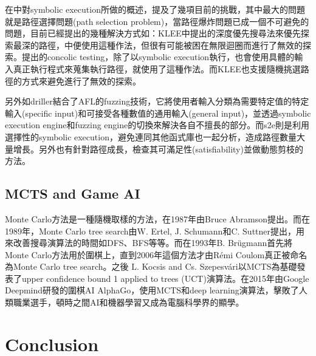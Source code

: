 \documentclass[12pt,a4paper,oneside]{book}
\begin{document}
在\cite{sharma2012critical}\cite{schwartz2010all}中對symbolic execution所做的概述，提及了幾項目前的挑戰，其中最大的問題就是路徑選擇問題(path selection problem)，當路徑爆炸問題已成一個不可避免的問題，目前已經提出的幾種解決方式如：KLEE\cite{cadar2008klee}中提出的深度優先搜尋法來優先探索最深的路徑，中便使用這種作法，但很有可能被困在無限迴圈而進行了無效的探索。\cite{sen2007concolic}提出的concolic testing，除了以symbolic execution執行，也會使用具體的輸入真正執行程式來蒐集執行路徑，\cite{sen2005cute}就使用了這種作法。而KLEE\cite{cadar2008klee}也支援隨機挑選路徑的方式來避免進行了無效的探索。

另外如driller\cite{stephens2016driller}結合了AFL\cite{AFL}的fuzzing技術，它將使用者輸入分類為需要特定值的特定輸入(specific input)和可接受各種數值的通用輸入(general input)，並透過symbolic execution engine和fuzzing engine的切換來解決各自不擅長的部分。而s2e\cite{chipounov2012s2e}則是利用選擇性的symbolic execution，避免連同其他函式庫也一起分析，造成路徑數量大量增長。另外也有針對路徑成長，檢查其可滿足性(satisfiability)並做動態剪枝的方法\cite{PathPruning}。

\section{MCTS and Game AI}

Monte Carlo方法是一種隨機取樣的方法，在1987年由Bruce Abramson提出\cite{mcmethod}。而在1989年，Monte Carlo tree search由W. Ertel, J. Schumann和C. Suttner提出，用來改善搜尋演算法的時間如DFS、BFS等等。而在1993年B. Brügmann首先將Monte Carlo方法用於圍棋上\cite{mc_go}，直到2006年這個方法才由Rémi Coulom真正被命名為Monte Carlo tree search\cite{MCTS_naming}。之後 L. Kocsis and Cs. Szepesvári以MCTS為基礎發表了upper confidence bound 1 applied to trees (UCT)演算法\cite {UCT}。在2015年由Google Deepmind研發的圍棋AI AlphaGo\cite{alphago}，使用MCTS和deep learning演算法，擊敗了人類職業選手，頓時之間AI和機器學習又成為電腦科學界的顯學。

\chapter{Conclusion}

\newpage

\printbibliography[title={References}]
\end{document}
